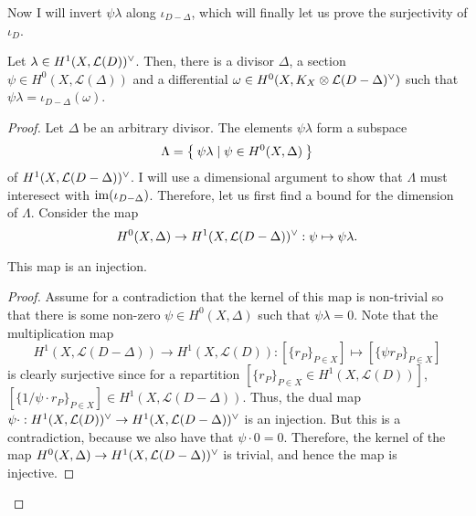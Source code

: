 Now I will invert $\psi\lambda$ along $\iota_{D-\Delta}$, which will finally
let us prove the surjectivity of $\iota_{D}$.
\begin{lemm}\label{lemm:invert_iota}
  Let $\lambda\in H^1(X,\mathcal{L}(D))^{\vee}$. Then, there is a divisor $\Delta$,
  a section $\psi\in H^{0}(X,\mathcal{L}(\Delta))$ and a differential
  $\omega\in H^0(X,K_X\otimes\mathcal{L}(D-\Delta)^{\vee})$ such that $\psi\lambda
  =\iota_{D-\Delta}(\omega)$.
\end{lemm}
\begin{proof}
  Let $\Delta$ be an arbitrary divisor. The elements $\psi\lambda$ form a
  subspace
  \[
    \Lambda=\Set{\psi\lambda\mid\psi\in H^{0}(X,\Delta)}
  \]
  of $H^1(X,\mathcal{L}(D-\Delta))^{\vee}$. I will use a dimensional argument to show that
  $\Lambda$ must interesect with $\operatorname{im}(\iota_{D-\Delta})$. Therefore,
  let us first find a bound for the dimension of $\Lambda$. Consider the map
  \[H^{0}(X,\Delta)\to H^1(X,\mathcal{L}(D-\Delta))^{\vee}:\psi\mapsto\psi\lambda.\]
  \begin{claim}
    This map is an injection.
  \end{claim}
  {\renewcommand{\qedsymbol}{$\blacksquare$}
    \begin{proof}
      Assume for a contradiction that the kernel of this map is non-trivial
      so that there is some non-zero $\psi\in H^{0}(X,\Delta)$ such that
      $\psi\lambda=0$. Note that the multiplication map
      \[
        H^{1}(X,\mathcal{L}(D-\Delta))\to H^{1}(X,\mathcal{L}(D))
        :[\{r_{P}\}_{P\in X}]\mapsto [\{\psi r_{P}\}_{P\in X}]
      \]
      is clearly surjective since for a repartition
      $[\{r_{P}\}_{P\in X}\in H^{1}(X,\mathcal{L}(D))]$,
      $[\{1/\psi\cdot r_{P}\}_{P\in X}]\in H^{1}(X,\mathcal{L}(D-\Delta))$.
      Thus, the dual map $\psi\cdot:H^1(X,\mathcal{L}(D))^{\vee}\to H^1(X,\mathcal{L}(D-\Delta))^{\vee}$ is an injection. But this is a contradiction, because we also have that
      $\psi\cdot 0=0$. Therefore, the kernel of the map
      $H^{0}(X,\Delta)\to H^1(X,\mathcal{L}(D-\Delta))^{\vee}$ is trivial, and hence the map is
      injective.
    \end{proof}
  }


\end{proof}
